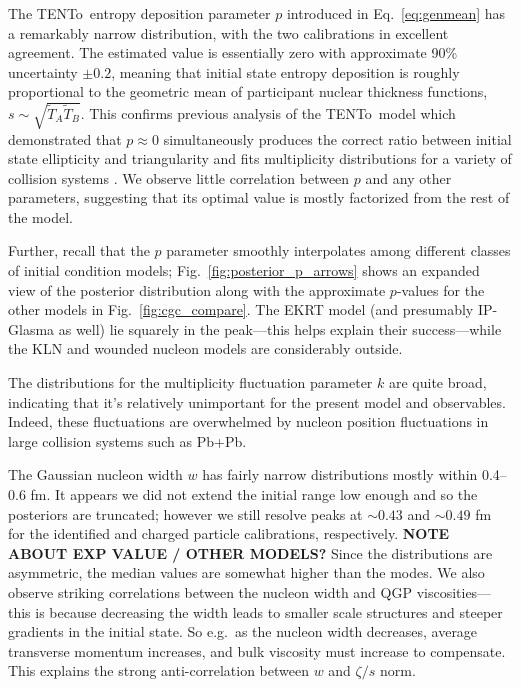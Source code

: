 \documentclass[aps,prc,reprint,amsmath,nofootinbib,superscriptaddress]{revtex4-1}
\newcommand{\trento}{T\raisebox{-0.5ex}{R}ENTo}
\newcommand{\T}{\tilde{T}}
\begin{document}
The \trento\ entropy deposition parameter $p$ introduced in Eq.~\eqref{eq:genmean} has a remarkably narrow distribution, with the two calibrations in excellent agreement.
The estimated value is essentially zero with approximate 90\% uncertainty $\pm0.2$, meaning that initial state entropy deposition is roughly proportional to the geometric mean of participant nuclear thickness functions, $s \sim \sqrt{\T_A\T_B}$.
This confirms previous analysis of the \trento\ model which demonstrated that $p \approx 0$ simultaneously produces the correct ratio between initial state ellipticity and triangularity and fits multiplicity distributions for a variety of collision systems \cite{Moreland:2014oya}.
We observe little correlation between $p$ and any other parameters, suggesting that its optimal value is mostly factorized from the rest of the model.

Further, recall that the $p$ parameter smoothly interpolates among different classes of initial condition models;
Fig.~\ref{fig:posterior_p_arrows} shows an expanded view of the posterior distribution along with the approximate $p$-values for the other models in Fig.~\ref{fig:cgc_compare}.
The EKRT model (and presumably IP-Glasma as well) lie squarely in the peak---this helps explain their success---while the KLN and wounded nucleon models are considerably outside.

The distributions for the multiplicity fluctuation parameter $k$ are quite broad, indicating that it's relatively unimportant for the present model and observables.
Indeed, these fluctuations are overwhelmed by nucleon position fluctuations in large collision systems such as Pb+Pb.

The Gaussian nucleon width $w$ has fairly narrow distributions mostly within 0.4--0.6 fm.
It appears we did not extend the initial range low enough and so the posteriors are truncated;
however we still resolve peaks at ${\sim}0.43$ and ${\sim}0.49$ fm for the identified and charged particle calibrations, respectively.
\textbf{NOTE ABOUT EXP VALUE / OTHER MODELS?}
Since the distributions are asymmetric, the median values are somewhat higher than the modes.
We also observe striking correlations between the nucleon width and QGP viscosities---this is because decreasing the width leads to smaller scale structures and steeper gradients in the initial state.
So e.g.\ as the nucleon width decreases, average transverse momentum increases, and bulk viscosity must increase to compensate.
This explains the strong anti-correlation between $w$ and $\zeta/s$ norm.
\end{document}
